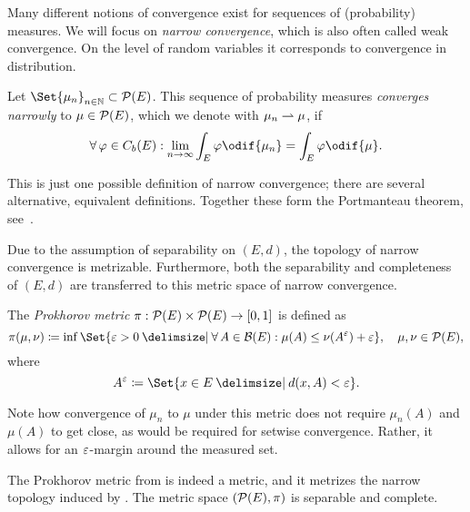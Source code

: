 Many different notions of convergence exist for sequences of (probability) measures.
We will focus on \textit{narrow convergence}, which is also often called weak convergence.
On the level of random variables it corresponds to convergence in distribution.

\begin{definition}\label{def:narrow-conv}
  Let \(\Set{\mu_n}_{n\in\bN} \subset \cP(E)\).
  This sequence of probability measures \textit{converges narrowly} to \(\mu \in \mathcal{P}(E)\), which we denote with \( \mu_n \rightharpoonup \mu \), if
  \begin{equation}
    \forall \varphi \in C_b(E) : \lim_{n\to\infty} \int_E \varphi \odif{\mu_n} = \int_E \varphi \odif{\mu}.
  \end{equation}
\end{definition}

\begin{remark}
  This is just one possible definition of narrow convergence; there are several alternative, equivalent definitions.
  Together these form the Portmanteau theorem, see~\cite[16]{billingsleyConvergenceProbabilityMeasures1999}.
\end{remark}

Due to the assumption of separability on \( (E, d) \), the topology of narrow convergence is metrizable.
Furthermore, both the separability and completeness of \( (E, d) \) are transferred to this metric space of narrow convergence.

\begin{definition}\label{def:prok-metric}
  The \textit{Prokhorov metric} \( \pi : \mathcal{P}(E) \times \mathcal{P}(E) \to [0,1] \) is defined as
  \begin{equation}
    \pi(\mu, \nu) \coloneqq \inf\Set{ \eps > 0 \given \forall A \in \cB(E) : \mu(A) \leq \nu(A^\eps) + \eps }, \quad \mu, \nu \in \cP(E),
  \end{equation}
  where
  \begin{equation}
    A^\eps \coloneqq \Set{ x \in E \given d(x, A) < \eps }.
  \end{equation}
\end{definition}

Note how convergence of \( \mu_n \) to \( \mu \) under this metric does not require \( \mu_n(A) \) and \( \mu(A) \) to get close, as would be required for setwise convergence.
Rather, it allows for an \( \varepsilon \)-margin around the measured set.

\begin{theorem}\label{thm:narrow-metrization}
  The Prokhorov metric from  is indeed a metric, and it metrizes the narrow topology induced by .
  The metric space \( (\mathcal{P}(E), \pi) \) is separable and complete.
\end{theorem}

